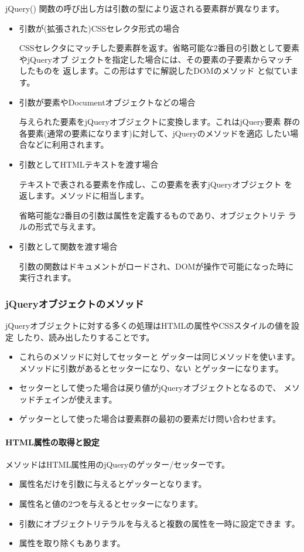 jQuery() 関数の呼び出し方は引数の型により返される要素群が異なります。
\begin{itemize}
 \item 引数が(拡張された)CSSセレクタ形式の場合

 CSSセレクタにマッチした要素群を返す。省略可能な2番目の引数として要素やjQueryオブ
       ジェクトを指定した場合には、その要素の子要素からマッチしたものを
       返します。この形はすでに解説したDOMのメソッド
       と似ています。
 \item 引数が要素やDocumentオブジェクトなどの場合

       与えられた要素をjQueryオブジェクトに変換します。これはjQuery要素
       群の各要素(通常の要素になります)に対して、jQueryのメソッドを適応
       したい場合などに利用されます。
 \item 引数としてHTMLテキストを渡す場合

       テキストで表される要素を作成し、この要素を表すjQueryオブジェクト
       を返します。メソッドに相当します。

       省略可能な2番目の引数は属性を定義するものであり、オブジェクトリテ
       ラルの形式で与えます。
 \item 引数として関数を渡す場合

       引数の関数はドキュメントがロードされ、DOMが操作で可能になった時に
       実行されます。
\end{itemize}
\subsubsection{jQueryオブジェクトのメソッド}\label{jQueryMethod}
jQueryオブジェクトに対する多くの処理はHTMLの属性やCSSスタイルの値を設定
したり、読み出したりすることです。
\begin{itemize}
 \item これらのメソッドに対してセッターと
ゲッターは同じメソッドを使います。メソッドに引数があるとセッターになり、ない
とゲッターになります。
 \item セッターとして使った場合は戻り値がjQueryオブジェクトとなるので、
       メソッドチェインが使えます。
 \item ゲッターとして使った場合は要素群の最初の要素だけ問い合わせます。
\end{itemize}
\paragraph{HTML属性の取得と設定}
メソッドはHTML属性用のjQueryのゲッター/セッターです。
\begin{itemize}
 \item 属性名だけを引数に与えるとゲッターとなります。
 \item 属性名と値の2つを与えるとセッターになります。
 \item 引数にオブジェクトリテラルを与えると複数の属性を一時に設定できま
			 す。
 \item 属性を取り除くもあります。
\end{itemize}
